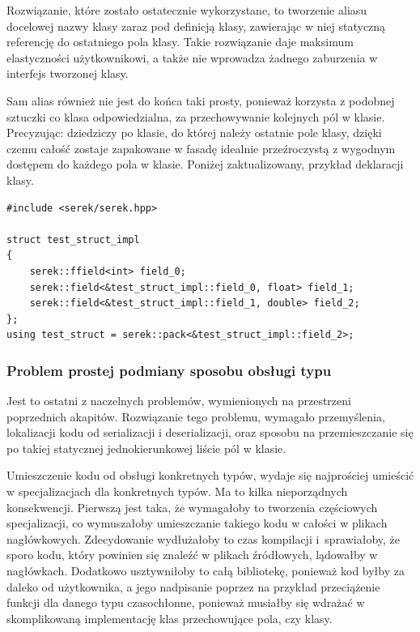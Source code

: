 \documentclass[12pt]{article}
\newcommand{\n}{\newline}
\begin{document}
{{{				Rozwiązanie, które zostało ostatecznie wykorzystane, to tworzenie aliasu docelowej nazwy klasy zaraz pod definicją klasy,
				zawierając w niej statyczną referencję do ostatniego pola klasy. Takie rozwiązanie daje maksimum elastyczności użytkownikowi,
				a także nie wprowadza żadnego zaburzenia w interfejs tworzonej klasy.\n

				Sam alias również nie jest do końca taki prosty, ponieważ korzysta z podobnej sztuczki co klasa odpowiedzialna, za przechowywanie
				kolejnych pól w klasie. Precyzując: dziedziczy po klasie, do której należy ostatnie pole klasy, dzięki czemu całość zostaje
				zapakowane w fasadę idealnie przeźroczystą z wygodnym dostępem do każdego pola w klasie. Poniżej zaktualizowany, przykład deklaracji klasy.\n

				\begin{lstlisting}[frame=single]
#include <serek/serek.hpp>

struct test_struct_impl
{
	serek::ffield<int> field_0;
	serek::field<&test_struct_impl::field_0, float> field_1;
	serek::field<&test_struct_impl::field_1, double> field_2;
};
using test_struct = serek::pack<&test_struct_impl::field_2>;
				\end{lstlisting}
			}

			{
				\subsubsection{Problem prostej podmiany sposobu obsługi typu}

				Jest to ostatni z naczelnych problemów, wymienionych na przestrzeni poprzednich akapitów. Rozwiązanie tego problemu,
				wymagało przemyślenia, lokalizacji kodu od serializacji i deserializacji, oraz sposobu na przemieszczanie się po takiej
				statycznej jednokierunkowej liście pól w klasie.\n

				Umieszczenie kodu od obsługi konkretnych typów, wydaje się najprościej umieścić w specjalizacjach dla konkretnych typów.
				Ma to kilka nieporządnych konsekwencji. Pierwszą jest taka, że wymagałoby to tworzenia częściowych specjalizacji, co
				wymuszałoby umieszczanie takiego kodu w całości w plikach nagłówkowych. Zdecydowanie wydłużałoby to czas kompilacji
				i~sprawiałoby, że sporo kodu, który powinien się znaleźć w plikach źródłowych, lądowałby w nagłówkach. Dodatkowo
				usztywniłoby to całą bibliotekę, ponieważ kod byłby za daleko od użytkownika, a jego nadpisanie poprzez na przykład
				przeciążenie funkcji dla danego typu czasochłonne, ponieważ musiałby się wdrażać w skomplikowaną implementację klas
				przechowujące pola, czy klasy.\n

}}}
\end{document}
